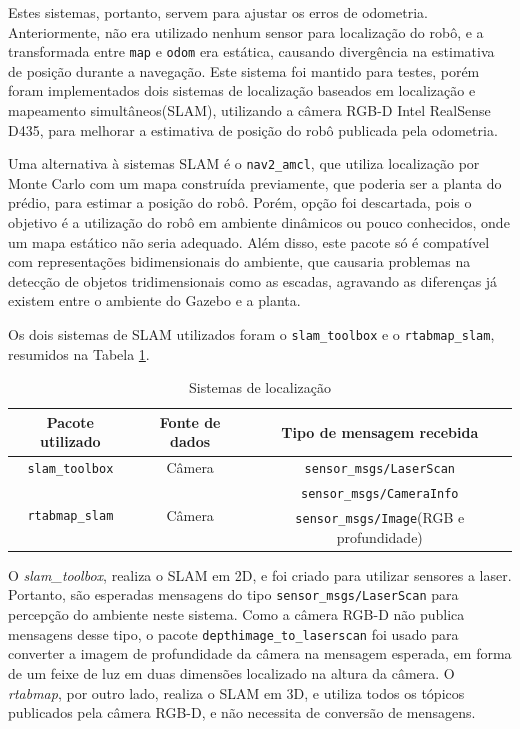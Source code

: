 \documentclass[repeatfields,xlists,xpacks,oneside,yearsonly]{ufrgscca}
\begin{document}
Estes sistemas, portanto, servem para ajustar os erros de odometria.
Anteriormente, não era utilizado nenhum sensor para localização do
robô, e a transformada entre \texttt{map} e \texttt{odom} era
estática, causando divergência na estimativa de posição durante a
navegação. Este sistema foi mantido para testes, porém foram
implementados dois sistemas de localização baseados em localização e
mapeamento simultâneos(SLAM), utilizando a câmera RGB-D Intel
RealSense D435, para melhorar a estimativa de posição do robô
publicada pela odometria.

Uma alternativa à sistemas SLAM é o \texttt{nav2\_amcl}, que utiliza
localização por Monte Carlo com um mapa construída previamente, que
poderia ser a planta do prédio, para estimar a posição do robô.
Porém, opção foi descartada, pois o objetivo é a utilização do robô
em ambiente dinâmicos ou pouco conhecidos, onde um mapa estático não
seria adequado. Além disso, este pacote só é compatível com
representações bidimensionais do ambiente, que causaria problemas na
detecção de objetos tridimensionais como as escadas, agravando as
diferenças já existem entre o ambiente do Gazebo e a planta.

Os dois sistemas de SLAM utilizados foram o \texttt{slam\_toolbox} e
o \texttt{rtabmap\_slam}, resumidos na Tabela \ref{tab:localizacao}.

\begin{table}[h]
    \begin{center}
        \caption{Sistemas de localização}
        \label{tab:localizacao}
        \begin{tabular}{c|c|c}
            Pacote utilizado                        & Fonte de dados          & Tipo de mensagem recebida                       \\
            \hline
            \texttt{slam\_toolbox}                  & Câmera                  & \texttt{sensor\_msgs/LaserScan}                 \\
            \hline
            \multirow{2}{*}{\texttt{rtabmap\_slam}} & \multirow{2}{*}{Câmera} & \texttt{sensor\_msgs/CameraInfo}                \\
                                                    &                         & \texttt{sensor\_msgs/Image}(RGB e profundidade) \\
        \end{tabular}
    \end{center}
\end{table}

O \textit{slam\_toolbox}, realiza o SLAM em 2D, e foi criado para
utilizar sensores a laser. Portanto, são esperadas mensagens do tipo
\texttt{sensor\_msgs/LaserScan} para percepção do ambiente neste
sistema. Como a câmera RGB-D não publica mensagens desse tipo, o
pacote \texttt{depthimage\_to\_laserscan} foi usado para converter a
imagem de profundidade da câmera na mensagem esperada, em forma de um
feixe de luz em duas dimensões localizado na altura da câmera. O
\textit{rtabmap}, por outro lado, realiza o SLAM em 3D, e utiliza
todos os tópicos publicados pela câmera RGB-D, e não necessita de
conversão de mensagens.
\end{document}
